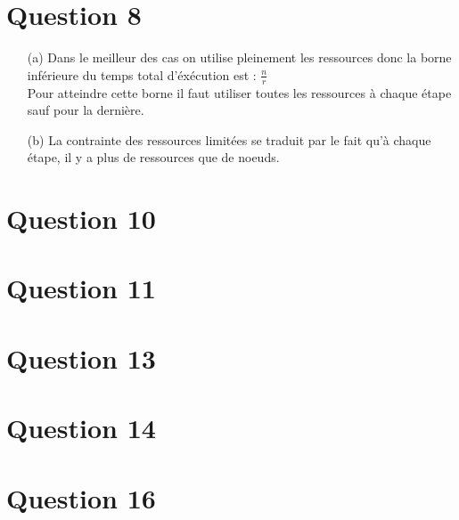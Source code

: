 \documentclass{report}
\begin{document}
\section{Question 8}

\begin{itemize}
	\item[(a)] Dans le meilleur des cas on utilise pleinement les ressources donc la borne inférieure du temps total d'éxécution est : $\frac{n}{r}$ \\
	Pour atteindre cette borne il faut utiliser toutes les ressources à chaque étape sauf pour la dernière.
	\item[(b)] La contrainte des ressources limitées se traduit par le fait qu'à chaque étape, il y a plus de ressources que de noeuds.
\end{itemize}

\section{Question 10}

\section{Question 11}

\section{Question 13}

\section{Question 14}

\section{Question 16}
\end{document}
